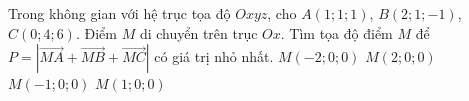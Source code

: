 \begin{ex}%
	Trong không gian với hệ trục tọa độ $Oxyz$, cho $A(1;1;1)$, $B(2;1;-1)$, $C(0;4;6)$. Điểm $M$ di chuyển trên trục $Ox$. Tìm tọa độ điểm $M$ để $P=\left|\vec{MA}+\vec{MB}+\vec{MC}\right|$ có giá trị nhỏ nhất.
	\choice
	{$M(-2;0;0)$}
	{$M(2;0;0)$}
	{$M(-1;0;0)$}
	{\True $M(1;0;0)$}
\end{ex}

